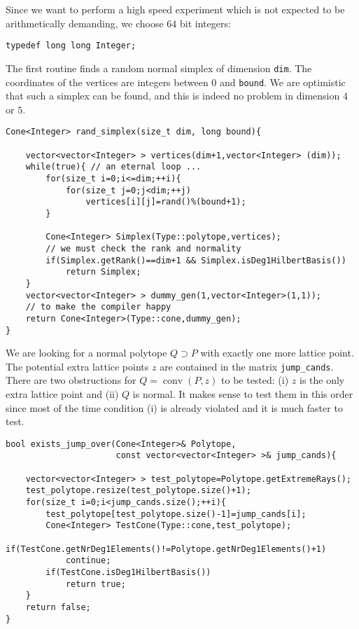 \documentclass[12pt,a4paper]{scrartcl}
\theoremstyle{definition}
\begin{document}
\begin{small}
Since we want to perform a high speed experiment which is not expected to be arithmetically demanding, we choose $64$ bit integers:
\begin{Verbatim}
typedef long long Integer;
\end{Verbatim}

The first routine finds a random normal simplex of dimension \verb|dim|. The coordinates of the vertices are integers between $0$ and \verb|bound|. We are optimistic that such a simplex can be found, and this is indeed no problem in dimension $4$ or $5$.

\begin{Verbatim}
Cone<Integer> rand_simplex(size_t dim, long bound){

    vector<vector<Integer> > vertices(dim+1,vector<Integer> (dim));
    while(true){ // an eternal loop ...
        for(size_t i=0;i<=dim;++i){
            for(size_t j=0;j<dim;++j)
                vertices[i][j]=rand()%(bound+1);
        }

        Cone<Integer> Simplex(Type::polytope,vertices);
        // we must check the rank and normality
        if(Simplex.getRank()==dim+1 && Simplex.isDeg1HilbertBasis())
            return Simplex;
    }
    vector<vector<Integer> > dummy_gen(1,vector<Integer>(1,1)); 
    // to make the compiler happy
    return Cone<Integer>(Type::cone,dummy_gen); 
}
\end{Verbatim}

We are looking for a normal polytope $Q\supset P$ with exactly one more lattice point. The potential extra lattice points $z$ are contained in the matrix \verb|jump_cands|. There are two obstructions for $Q=\operatorname{conv}(P,z)$ to be tested: (i) $z$ is the only extra lattice point and (ii) $Q$ is normal. It makes sense to test them in this order since most of the time condition (i) is already violated and it is much faster to test.
\begin{Verbatim}
bool exists_jump_over(Cone<Integer>& Polytope, 
                      const vector<vector<Integer> >& jump_cands){

    vector<vector<Integer> > test_polytope=Polytope.getExtremeRays();
    test_polytope.resize(test_polytope.size()+1); 
    for(size_t i=0;i<jump_cands.size();++i){
        test_polytope[test_polytope.size()-1]=jump_cands[i];
        Cone<Integer> TestCone(Type::cone,test_polytope);
        if(TestCone.getNrDeg1Elements()!=Polytope.getNrDeg1Elements()+1)
            continue;
        if(TestCone.isDeg1HilbertBasis())
            return true;
    }
    return false;
}
\end{Verbatim}


\end{small}
\end{document}
